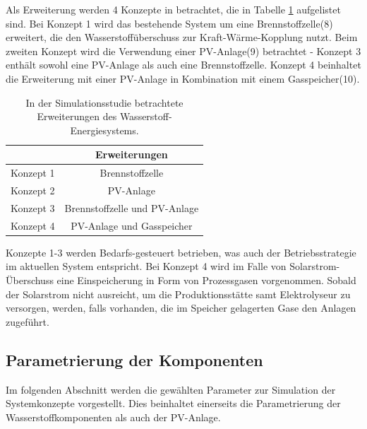Als Erweiterung werden 4 Konzepte in betrachtet, die in Tabelle \ref{tb:Konzepte} aufgelistet sind. Bei Konzept 1 wird das bestehende System um eine Brennstoffzelle(8) erweitert, die den Wasserstoffüberschuss zur Kraft-Wärme-Kopplung nutzt. Beim zweiten Konzept wird die Verwendung einer PV-Anlage(9) betrachtet - Konzept 3 enthält sowohl eine PV-Anlage als auch eine Brennstoffzelle. Konzept 4 beinhaltet die Erweiterung mit einer PV-Anlage in Kombination mit einem Gasspeicher(10).

\begin{table}[ht]
		\centering
		\caption{In der Simulationsstudie betrachtete Erweiterungen des Wasserstoff-Energiesystems.}
		\begin{tabular}{l c}
		\toprule
		 & Erweiterungen\\	
		\midrule
		Konzept 1 & Brennstoffzelle\\
		Konzept 2 & PV-Anlage\\
		Konzept 3 & Brennstoffzelle und PV-Anlage\\
		Konzept 4 & PV-Anlage und Gasspeicher\\
		\bottomrule
		\end{tabular}
		\label{tb:Konzepte}
\end{table}	
   
Konzepte 1-3 werden Bedarfs-gesteuert betrieben, was auch der Betriebsstrategie im aktuellen System entspricht. Bei Konzept 4 wird im Falle von Solarstrom-Überschuss eine Einspeicherung in Form von Prozessgasen vorgenommen. Sobald der Solarstrom nicht ausreicht, um die Produktionsstätte samt Elektrolyseur zu versorgen, werden, falls vorhanden, die im Speicher gelagerten Gase den Anlagen zugeführt.

\subsection{Parametrierung der Komponenten}
Im folgenden Abschnitt werden die gewählten Parameter zur Simulation der Systemkonzepte vorgestellt. Dies beinhaltet einerseits die Parametrierung der Wasserstoffkomponenten als auch der PV-Anlage.

